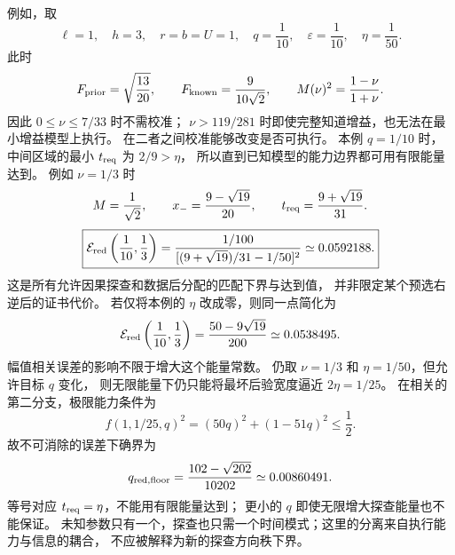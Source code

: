 \documentclass[11pt,a4paper]{article}
\numberwithin{equation}{section}
\theoremstyle{definition}
\begin{document}
例如，取
\begin{equation}
 \ell=1,\quad h=3,\quad r=b=U=1,\quad
 q=\frac1{10},\quad\varepsilon=\frac1{10},\quad\eta=\frac1{50}.
 \label{v44r:eq:numerical-parameters}
\end{equation}
此时
\[
 F_{\rm prior}=\sqrt{\frac{13}{20}},\qquad
 F_{\rm known}=\frac9{10\sqrt2},\qquad
 M(\nu)^2=\frac{1-\nu}{1+\nu}.
\]
因此 $0\le\nu\le7/33$ 时不需校准；
$\nu>119/281$ 时即使完整知道增益，也无法在最小增益模型上执行。
在二者之间校准能够改变是否可执行。
本例 $q=1/10$ 时，中间区域的最小 $t_{\rm req}$ 为 $2/9>\eta$，
所以直到已知模型的能力边界都可用有限能量达到。
例如 $\nu=1/3$ 时
\[
 M=\frac1{\sqrt2},\qquad
 x_-=\frac{9-\sqrt{19}}{20},\qquad
 t_{\rm req}=\frac{9+\sqrt{19}}{31}.
\]
\begin{equation}
 \boxed{
 \mathcal E_{\rm red}\left(\frac1{10},\frac13\right)
 =\frac{1/100}{[(9+\sqrt{19})/31-1/50]^2}
 \simeq0.0592188.}
 \label{v44r:eq:numerical-positive-energy}
\end{equation}
这是所有允许因果探查和数据后分配的匹配下界与达到值，
并非限定某个预选右逆后的证书代价。
若仅将本例的 $\eta$ 改成零，则同一点简化为
\[
 \mathcal E_{\rm red}\left(\frac1{10},\frac13\right)
 =\frac{50-9\sqrt{19}}{200}\simeq0.0538495.
\]
幅值相关误差的影响不限于增大这个能量常数。
仍取 $\nu=1/3$ 和 $\eta=1/50$，但允许目标 $q$ 变化，
则无限能量下仍只能将最坏后验宽度逼近 $2\eta=1/25$。
在相关的第二分支，极限能力条件为
\[
 f(1,1/25,q)^2=(50q)^2+(1-51q)^2\le\frac12.
\]
故不可消除的误差下确界为
\begin{equation}
 q_{\rm red,floor}
 =\frac{102-\sqrt{202}}{10202}
 \simeq0.00860491.
 \label{v44r:eq:example-noise-floor}
\end{equation}
等号对应 $t_{\rm req}=\eta$，不能用有限能量达到；
更小的 $q$ 即使无限增大探查能量也不能保证。
未知参数只有一个，探查也只需一个时间模式；这里的分离来自执行能力与信息的耦合，
不应被解释为新的探查方向秩下界。
\end{document}
